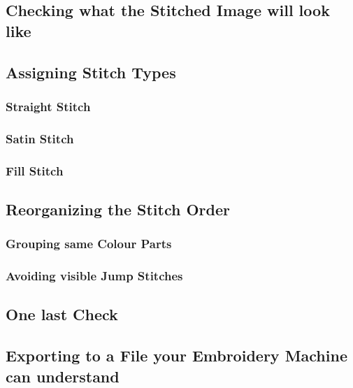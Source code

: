\documentclass{article}
\begin{document}
        \subsection{Checking what the Stitched Image will look like}

        \subsection{Assigning Stitch Types}

            \subsubsection{Straight Stitch}

            \subsubsection{Satin Stitch}

            \subsubsection{Fill Stitch}

        \subsection{Reorganizing the Stitch Order}

            \subsubsection{Grouping same Colour Parts}

            \subsubsection{Avoiding visible Jump Stitches}

        \subsection{One last Check}

        \subsection{Exporting to a File your Embroidery Machine can understand}
\end{document}
